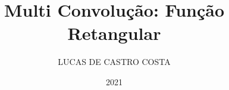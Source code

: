\documentclass[G]{cpgf}
\begin{document}
\title{Multi Convolução: Função Retangular}
\author{LUCAS DE CASTRO COSTA} %
\date{2021}







\capa %

% 



% 


\tableofcontents        








% 


 


\apendices 


%
\end{document}
